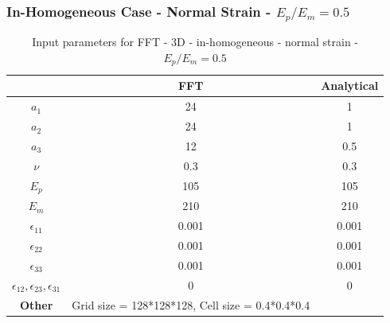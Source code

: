 \documentclass[12pt, a4paper]{report}
\begin{document}
\newpage

\subsubsection{In-Homogeneous Case - Normal Strain - $E_p/E_m = 0.5$}
\begin{table}[H]
    \centering
    \begin{tabular}{|c|c|c|}
        \hline
        & \textbf{FFT} &\textbf{Analytical}\\
        \hline
        \textbf{$a_1$} & 24 & 1 \\
        \hline
        \textbf{$a_2$} & 24 & 1 \\
        \hline
        \textbf{$a_3$} & 12 & 0.5 \\
        \hline
        \textbf{$\nu$} & 0.3 & 0.3 \\
        \hline
        \textbf{$E_p$} & 105 & 105 \\
        \hline
        \textbf{$E_m$} & 210 & 210 \\
        \hline
        \textbf{$\epsilon_{11}$} & 0.001 & 0.001 \\
        \hline
        \textbf{$\epsilon_{22}$} & 0.001 & 0.001 \\
        \hline
        \textbf{$\epsilon_{33}$} & 0.001 & 0.001 \\
        \hline
        \textbf{$\epsilon_{12}, \epsilon_{23}, \epsilon_{31}$} & 0 & 0 \\
        \hline
        \textbf{Other} & Grid size = 128*128*128, Cell size = 0.4*0.4*0.4 &  \\
        \hline
    \end{tabular}
    \caption{Input parameters for FFT - 3D - in-homogeneous - normal strain - $E_p/E_m = 0.5$}
\end{table}
\end{document}

